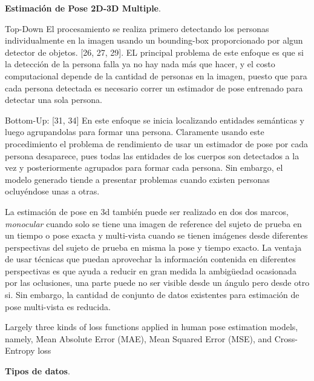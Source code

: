 \textbf{Estimación de Pose 2D-3D Multiple}.


Top-Down El procesamiento se realiza primero detectando los personas individualmente en la imagen
usando un bounding-box proporcionado por algun detector de objetos. [26, 27, 29].
EL principal problema de este enfoque es que si la detección de la persona falla ya no hay nada más
que hacer, y el costo computacional depende de la cantidad de personas en la imagen, puesto que para
cada persona detectada es necesario correr un estimador de pose entrenado para detectar una sola
persona.

Bottom-Up: [31, 34] En este enfoque se inicia localizando entidades semánticas y luego agrupandolas
para formar una persona. Claramente usando este procedimiento el problema de rendimiento de usar un
estimador de pose por cada persona desaparece, pues todas las entidades de los cuerpos son detectados
a la vez y posteriormente agrupados para formar cada persona. Sin embargo, el modelo generado tiende
a presentar problemas cuando existen personas ocluyéndose unas a otras.


La estimación de pose en 3d también puede ser realizado en dos dos marcos, \textit{monocular}
cuando solo se tiene una imagen de reference del sujeto de prueba en un tiempo o pose exacta y
multi-vista cuando se tienen imágenes desde diferentes perspectivas del sujeto de prueba en misma
la pose y tiempo exacto. La ventaja de usar técnicas que puedan aprovechar la información contenida
en diferentes perspectivas es que ayuda a reducir en gran medida la ambigüedad ocasionada por las
oclusiones, una parte puede no ser visible desde un ángulo pero desde otro si. Sin embargo, la
cantidad de conjunto de datos existentes para estimación de pose multi-vista es reducida.


Largely three kinds of loss functions applied in human pose estimation models, namely, Mean Absolute
Error (MAE), Mean Squared Error (MSE), and Cross-Entropy loss


\textbf{Tipos de datos}.

